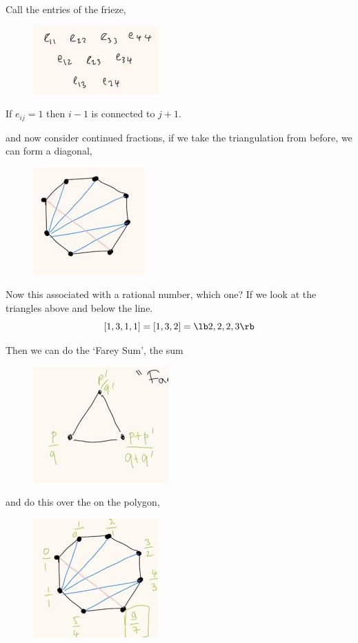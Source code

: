 \documentclass{article}
\begin{document}
Call the entries of the frieze,
\begin{figure}[!ht]
\centering
\includegraphics{./figures/L3.2}
\caption{}
\end{figure}

If $e_{ij} = 1$ then $i-1$ is connected to $j+1$.

and now consider continued fractions, if we take the triangulation from before, we can form a diagonal,
\begin{figure}[!ht]
\centering
\includegraphics{./figures/L3.3}
\end{figure}

Now this associated with a rational number, which one? If we look at the triangles above and below the line.
$$ [1, 3, 1,1] = [1, 3, 2] = \lb 2, 2, 2, 3\rb $$

Then we can do the `Farey Sum', the sum

\begin{figure}[!ht]
\centering
\includegraphics{./figures/L3.4}
\end{figure}

and do this over the on the polygon,

\begin{figure}[!ht]
\centering
\includegraphics{./figures/L3.5}
\end{figure}
\end{document}
